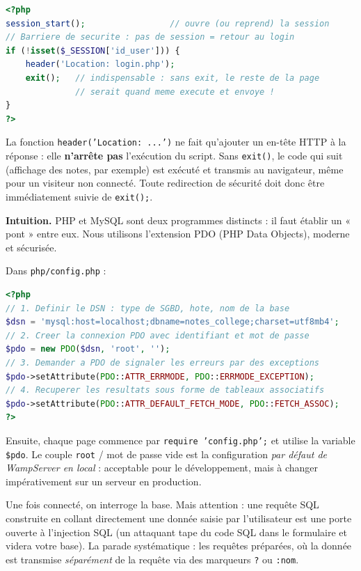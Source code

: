 \documentclass[11pt]{article}
\newcommand{\cle}[1]{{\popxbold\color{popdark}#1}}
\newcounter{popsec}
\newcounter{popsub}
\newcommand{\courssub}[1]{%
  \stepcounter{popsub}%
  \par\vspace{9pt}\noindent{\popxbold\fontsize{11.5}{13}\selectfont\color{popink}{\color{poporange}\thepopsec.\thepopsub}\hspace{6pt}#1}\par\nopagebreak\vspace{4pt}
}
\begin{document}
\begin{lstlisting}[language=Php]
<?php
session_start();                 // ouvre (ou reprend) la session
// Barriere de securite : pas de session = retour au login
if (!isset($_SESSION['id_user'])) {
    header('Location: login.php');
    exit();   // indispensable : sans exit, le reste de la page
              // serait quand meme execute et envoye !
}
?>
\end{lstlisting}

\begin{attention}
La fonction \texttt{header('Location: ...')} ne fait qu'ajouter un en-tête HTTP à la réponse : elle \textbf{n'arrête pas} l'exécution du script. Sans \texttt{exit()}, le code qui suit (affichage des notes, par exemple) est exécuté et transmis au navigateur, même pour un visiteur non connecté. Toute redirection de sécurité doit donc être immédiatement suivie de \texttt{exit();}.
\end{attention}

\courssub{Connexion PHP--MySQL et requêtes préparées}

\textbf{Intuition.} PHP et MySQL sont deux programmes distincts : il faut établir un « pont » entre eux. Nous utilisons l'extension \cle{PDO} (PHP Data Objects), moderne et sécurisée.

\begin{methode}
Dans \texttt{php/config.php} :
\begin{lstlisting}[language=Php]
<?php
// 1. Definir le DSN : type de SGBD, hote, nom de la base
$dsn = 'mysql:host=localhost;dbname=notes_college;charset=utf8mb4';
// 2. Creer la connexion PDO avec identifiant et mot de passe
$pdo = new PDO($dsn, 'root', '');
// 3. Demander a PDO de signaler les erreurs par des exceptions
$pdo->setAttribute(PDO::ATTR_ERRMODE, PDO::ERRMODE_EXCEPTION);
// 4. Recuperer les resultats sous forme de tableaux associatifs
$pdo->setAttribute(PDO::ATTR_DEFAULT_FETCH_MODE, PDO::FETCH_ASSOC);
?>
\end{lstlisting}
Ensuite, chaque page commence par \texttt{require 'config.php';} et utilise la variable \texttt{\$pdo}. Le couple \texttt{root} / mot de passe vide est la configuration \emph{par défaut de WampServer en local} : acceptable pour le développement, mais à changer impérativement sur un serveur en production.
\end{methode}

Une fois connecté, on interroge la base. Mais attention : une requête SQL construite en collant directement une donnée saisie par l'utilisateur est une porte ouverte à l'\cle{injection SQL} (un attaquant tape du code SQL dans le formulaire et videra votre base). La parade systématique : les \cle{requêtes préparées}, où la donnée est transmise \emph{séparément} de la requête via des marqueurs \texttt{?} ou \texttt{:nom}.
\end{document}
